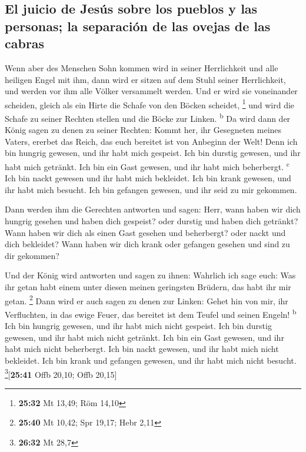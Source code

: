 \hypertarget{el-juicio-de-jesuxfas-sobre-los-pueblos-y-las-personas-la-separaciuxf3n-de-las-ovejas-de-las-cabras}{%
\subsection{El juicio de Jesús sobre los pueblos y las personas; la
separación de las ovejas de las
cabras}\label{el-juicio-de-jesuxfas-sobre-los-pueblos-y-las-personas-la-separaciuxf3n-de-las-ovejas-de-las-cabras}}

 Wenn aber des Menschen Sohn kommen wird in seiner
Herrlichkeit und alle heiligen Engel mit ihm, dann wird er sitzen auf
dem Stuhl seiner Herrlichkeit,  und werden vor ihm alle
Völker versammelt werden. Und er wird sie voneinander scheiden, gleich
als ein Hirte die Schafe von den Böcken scheidet, \footnote{\textbf{25:32}
  Mt 13,49; Röm 14,10}  und wird die Schafe zu seiner
Rechten stellen und die Böcke zur Linken. \textsuperscript{b}
 Da wird dann der König sagen zu denen zu seiner Rechten:
Kommt her, ihr Gesegneten meines Vaters, ererbet das Reich, das euch
bereitet ist von Anbeginn der Welt!  Denn ich bin hungrig
gewesen, und ihr habt mich gespeist. Ich bin durstig gewesen, und ihr
habt mich getränkt. Ich bin ein Gast gewesen, und ihr habt mich
beherbergt. \textsuperscript{c}  Ich bin nackt gewesen
und ihr habt mich bekleidet. Ich bin krank gewesen, und ihr habt mich
besucht. Ich bin gefangen gewesen, und ihr seid zu mir gekommen.

 Dann werden ihm die Gerechten antworten und sagen: Herr,
wann haben wir dich hungrig gesehen und haben dich gespeist? oder
durstig und haben dich getränkt?  Wann haben wir dich als
einen Gast gesehen und beherbergt? oder nackt und dich bekleidet?
 Wann haben wir dich krank oder gefangen gesehen und sind
zu dir gekommen?

 Und der König wird antworten und sagen zu ihnen:
Wahrlich ich sage euch: Was ihr getan habt einem unter diesen meinen
geringsten Brüdern, das habt ihr mir getan. \footnote{\textbf{25:40} Mt
  10,42; Spr 19,17; Hebr 2,11}  Dann wird er auch sagen
zu denen zur Linken: Gehet hin von mir, ihr Verfluchten, in das ewige
Feuer, das bereitet ist dem Teufel und seinen Engeln!
\textsuperscript{b}  Ich bin hungrig gewesen, und ihr
habt mich nicht gespeist. Ich bin durstig gewesen, und ihr habt mich
nicht getränkt.  Ich bin ein Gast gewesen, und ihr habt
mich nicht beherbergt. Ich bin nackt gewesen, und ihr habt mich nicht
bekleidet. Ich bin krank und gefangen gewesen, und ihr habt mich nicht
besucht. \footnote{\textbf{26:32} Mt 28,7}{[}\textbf{25:41} Offb 20,10;
Offb 20,15{]}

